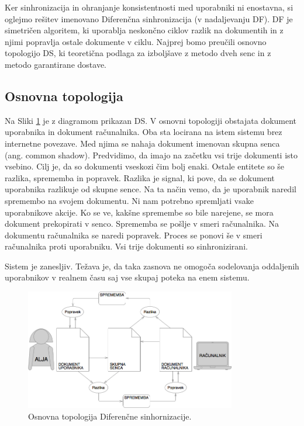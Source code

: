 \documentclass[a4paper, 12pt, twoside]{book}
\begin{document}
Ker sinhronizacija in ohranjanje konsistentnosti med uporabniki ni enostavna, si oglejmo rešitev imenovano Diferenčna sinhronizacija (v nadaljevanju DF). DF je simetričen algoritem, ki uporablja neskončno ciklov razlik na dokumentih in z njimi popravlja ostale dokumente v ciklu. Najprej bomo preučili osnovno topologijo DS, ki teoretična podlaga za izboljšave z metodo dveh senc in z metodo garantirane dostave.

\subsection{Osnovna topologija}

Na Sliki \ref{ds1} je z diagramom prikazan DS. V osnovni topologiji obstajata dokument uporabnika in dokument računalnika. Oba sta locirana na istem sistemu brez internetne povezave. Med njima se nahaja dokument imenovan skupna senca (ang. common shadow). Predvidimo, da imajo na začetku vsi trije dokumenti isto vsebino. Cilj je, da so dokumenti vseskozi čim bolj enaki. Ostale entitete so še razlika, sprememba in popravek. Razlika je signal, ki pove, da se dokument uporabnika razlikuje od skupne sence. Na ta način vemo, da je uporabnik naredil spremembo na svojem dokumentu. Ni nam potrebno spremljati vsake uporabnikove akcije. Ko se ve, kakšne spremembe so bile narejene, se mora dokument prekopirati v senco. Sprememba se pošlje v smeri računalnika. Na dokumentu računalnika se naredi popravek. Proces se ponovi še v smeri računalnika proti uporabniku. Vsi trije dokumenti so sinhronizirani.

Sistem je zanesljiv. Težava je, da taka zasnova ne omogoča sodelovanja oddaljenih uporabnikov v realnem času saj vse skupaj poteka na enem sistemu.

\begin{figure}[placement h]
\begin{center}
\includegraphics[width=9.2cm]{ds1.png}
\end{center}
\caption{Osnovna topologija Diferenčne sinhornizacije.}
\label{ds1}
\end{figure}
\end{document}
